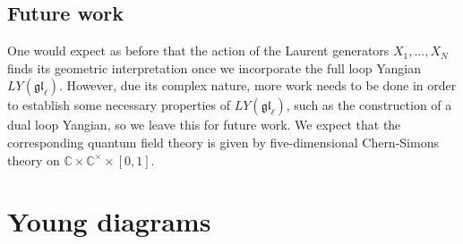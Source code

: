\documentclass[11pt]{report}
\theoremstyle{definition}
\theoremstyle{remark}
\theoremstyle{remark}
\newcommand{\C}{\mathbb{C}}
\begin{document}
\section*{Future work}

One would expect as before that the action of the Laurent generators $X_1,...,X_N$ finds its geometric interpretation once we incorporate the full loop Yangian $LY(\mathfrak{gl}_\ell)$. However, due its complex nature, more work needs to be done in order to establish some necessary properties of $LY(\mathfrak{gl}_\ell)$, such as the construction of a dual loop Yangian, so we leave this for future work. We expect that the corresponding quantum field theory is given by five-dimensional Chern-Simons theory on $\C \times \C^\times \times [0,1]$.



\appendix \label{appendix}

\chapter{Young diagrams} \label{appendix:youngdiagrams}
\end{document}
